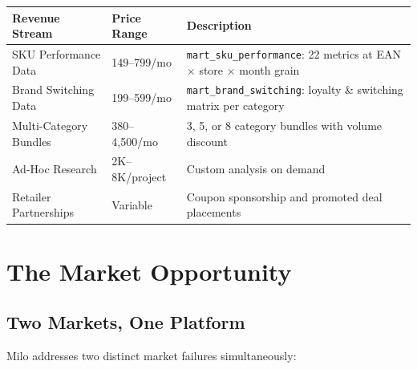 \documentclass[11pt,a4paper]{article}
\begin{document}
\begin{center}
\renewcommand{\arraystretch}{1.3}
\begin{tabularx}{\textwidth}{L{3.5cm} R{3cm} L{7cm}}
\toprule
{}
\textbf{\color{white}Revenue Stream} & \textbf{\color{white}Price Range} & \textbf{\color{white}Description} \\
\midrule
SKU Performance Data & \texteuro{}149--799/mo & \texttt{mart\_sku\_performance}: 22 metrics at EAN $\times$ store $\times$ month grain \\
Brand Switching Data & \texteuro{}199--599/mo & \texttt{mart\_brand\_switching}: loyalty \& switching matrix per category \\
Multi-Category Bundles & \texteuro{}380--4,500/mo & 3, 5, or 8 category bundles with volume discount \\
Ad-Hoc Research & \texteuro{}2K--8K/project & Custom analysis on demand \\
Retailer Partnerships & Variable & Coupon sponsorship and promoted deal placements \\
\bottomrule
\end{tabularx}
\end{center}

\clearpage

\section{The Market Opportunity}

\subsection{Two Markets, One Platform}

Milo addresses two distinct market failures simultaneously:
\end{document}
